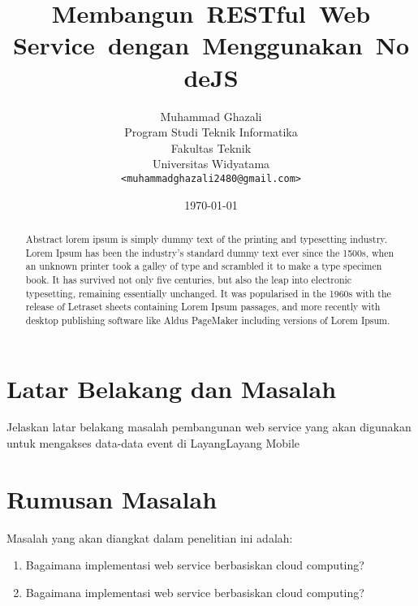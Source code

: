 \documentclass[a4paper, 12pt]{report}
\title{\textbf{Membangun\ RESTful\ Web Service\ dengan\ Menggunakan\ NodeJS}}
\author{
Muhammad Ghazali\\
Program Studi Teknik Informatika\\
Fakultas Teknik\\
Universitas Widyatama
\\ \texttt{<muhammadghazali2480@gmail.com>}
}
\date{\today}
\begin{document}
\maketitle

\tableofcontents
\setcounter{tocdepth}{3}

\listoffigures
\listoftables

\begin{abstract}
Abstract lorem ipsum is simply dummy text of the printing and typesetting industry. Lorem Ipsum has been the industry's standard dummy text ever since the 1500s, when an unknown printer took a galley of type and scrambled it to make a type specimen book. It has survived not only five centuries, but also the leap into electronic typesetting, remaining essentially unchanged. It was popularised in the 1960s with the release of Letraset sheets containing Lorem Ipsum passages, and more recently with desktop publishing software like Aldus PageMaker including versions of Lorem Ipsum.
\end{abstract}

\section*{Latar Belakang dan Masalah}
\begin{flushleft}
Jelaskan latar belakang masalah pembangunan web service yang akan digunakan untuk mengakses data-data event di LayangLayang Mobile
\end{flushleft}

\section*{Rumusan Masalah}
\begin{flushleft}
Masalah yang akan diangkat dalam penelitian ini adalah:
\begin{enumerate}
  \item Bagaimana implementasi web service berbasiskan cloud computing?
  \item Bagaimana implementasi web service berbasiskan cloud computing?
\end{enumerate}
\end{flushleft}
\end{document}
